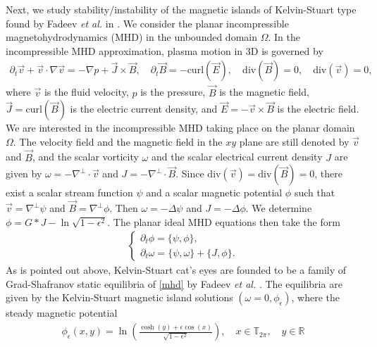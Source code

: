 \documentclass[1 [leqno, 11pt]{amsart}
\numberwithin{equation}{section}
\let\ep=\epsilon
\begin{document}
\begin{CJK*}{GBK}{song}
Next, we study stability/instability of  the  magnetic islands of Kelvin-Stuart type found by  Fadeev  {\it et al.} in \cite{Fadeev et al-1965}.
We
 consider
the planar incompressible magnetohydrodynamics (MHD) in the  unbounded domain $\Omega$.
In the incompressible MHD approximation,  plasma motion in  3D is governed by
\begin{align*}
\partial_t \vec{v}+\vec{v}\cdot\nabla\vec{v}=-\nabla p+\vec{J}\times \vec{B},\quad \partial_t\vec{B}=-\text{curl}(\vec{E}),\quad \text{div} (\vec{B})=0,\quad\text{div}(\vec{v})=0,
\end{align*}
where $\vec{v}$ is the fluid velocity, $p$ is the pressure, $\vec{B}$ is the magnetic field,  $\vec{J}=\text{curl}(\vec{B})$ is the electric current density,  and $\vec{E}=-\vec{v}\times \vec{B}$ is the electric field. We are interested in the incompressible MHD taking place on the planar domain $\Omega$. The velocity field and the magnetic field in the $xy$ plane are still denoted by $\vec{v}$ and $\vec{B}$,
and  the scalar  vorticity $\omega$ and the scalar  electrical current density $J$ are given by $\omega=-\nabla^\bot  \cdot\vec{v}$ and $J=-\nabla^\bot  \cdot \vec{B}$.
Since $\text{div}(\vec{v})=\text{div}(\vec{B})=0$, there exist a scalar  stream function $\psi$ and a scalar magnetic potential $\phi$  such that   $\vec{v}=\nabla^{\bot}\psi$ and $\vec{B}=\nabla^{\bot}\phi$.
Then $\omega=-\Delta\psi$ and $J=-\Delta \phi$.
We determine  $\phi
=G*J-\ln\sqrt{1-\epsilon^2}$.
 The planar ideal MHD equations then take the form
 \begin{align}\label{mhd}
\left\{ \begin{array}{lll} \partial_t \phi=\{\psi,\phi\},\\
 \partial_t \omega=\{\psi,\omega\}+\{J,\phi\}.
 \end{array} \right.
\end{align}
As is pointed out above, Kelvin-Stuart cat's eyes are founded to be  a family of Grad-Shafranov static equilibria of \eqref{mhd}  by Fadeev  {\it et al.} \cite{Fadeev et al-1965}. The equilibria are given by the Kelvin-Stuart magnetic island solutions $(\omega=0,\phi_{\ep})$, where the steady  magnetic potential
 \begin{align}\label{Kelvin-Stuart cat's eyes-mhd-m-p}\phi_\ep(x,y)=\ln \left(\frac{\cosh (y) + \epsilon \cos (x)}{\sqrt{1-\epsilon^2}} \right),\quad x\in\mathbb{T}_{2\pi},\quad y\in\mathbb{R}

\end{align}
\end{CJK*}
\end{document}

